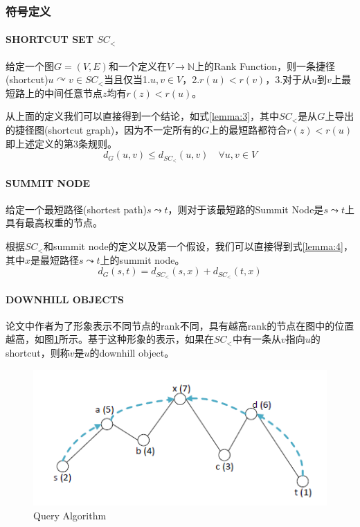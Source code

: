 \documentclass{ML}
\begin{document}
\subsubsection{符号定义}
\paragraph{SHORTCUT SET $SC_{<}$} 给定一个图$G=(V, E)$和一个定义在$V \to \mathbb{N}$上的Rank Function，则一条捷径(shortcut)$u \curvearrowright v \in SC_{<}$当且仅当1.$u, v \in V$，2.$r(u) < r(v)$，3.对于从$u$到$v$上最短路上的中间任意节点$z$均有$r(z) < r(u)$。

从上面的定义我们可以直接得到一个结论，如式\eqref{lemma:3}，其中$SC_{<}$是从$G$上导出的捷径图(shortcut graph)，因为不一定所有的$G$上的最短路都符合$r(z) < r(u)$即上述定义的第3条规则。
\begin{equation}
d_{G}(u, v) \leq d_{SC_{<}}(u, v) \quad \forall u, v \in V
\label{lemma:3}
\end{equation}
\paragraph{SUMMIT NODE}
给定一个最短路径(shortest path)$s \leadsto t$，则对于该最短路的Summit Node是$s \leadsto t$上具有最高权重的节点。

根据$SC_{<}$和summit node的定义以及第一个假设，我们可以直接得到式\eqref{lemma:4}，其中$x$是最短路径$s \leadsto t$上的summit node。
\begin{equation}
d_{G}(s, t)=d_{SC_{<}}(s, x)+d_{SC_{<}}(t, x)
\label{lemma:4}
\end{equation}
\paragraph{DOWNHILL OBJECTS}
论文中作者为了形象表示不同节点的rank不同，具有越高rank的节点在图中的位置越高，如图\ref{fig:downhill}所示。基于这种形象的表示，如果在$SC_{<}$中有一条从$v$指向$u$的shortcut，则称$v$是$u$的downhill object。
\begin{figure}[htb]
	\centering
	\includegraphics[width=0.6\linewidth]{media/downhill.png}
	\caption{Query Algorithm}\label{fig:downhill}
\end{figure}
\end{document}
